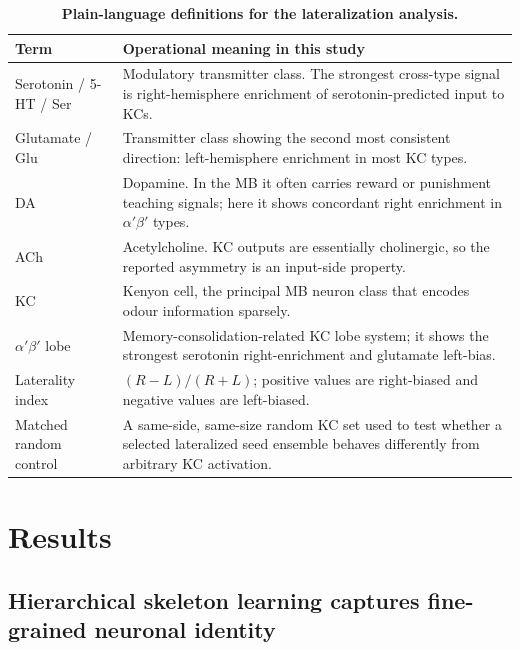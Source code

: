 \documentclass[10pt]{article}
\begin{document}
\begin{table}[!ht]
\centering\small
\caption{\textbf{Plain-language definitions for the lateralization analysis.}}
\label{tab:reader_guide}
\begin{tabularx}{\linewidth}{@{}p{3.2cm}X@{}}
\toprule
Term & Operational meaning in this study \\
\midrule
Serotonin / 5-HT / Ser & Modulatory transmitter class. The strongest cross-type signal is right-hemisphere enrichment of serotonin-predicted input to KCs. \\
Glutamate / Glu & Transmitter class showing the second most consistent direction: left-hemisphere enrichment in most KC types. \\
DA & Dopamine. In the MB it often carries reward or punishment teaching signals; here it shows concordant right enrichment in $\alpha'\beta'$ types. \\
ACh & Acetylcholine. KC outputs are essentially cholinergic, so the reported asymmetry is an input-side property. \\
KC & Kenyon cell, the principal MB neuron class that encodes odour information sparsely. \\
$\alpha'\beta'$ lobe & Memory-consolidation-related KC lobe system; it shows the strongest serotonin right-enrichment and glutamate left-bias. \\
Laterality index & \((R-L)/(R+L)\); positive values are right-biased and negative values are left-biased. \\
Matched random control & A same-side, same-size random KC set used to test whether a selected lateralized seed ensemble behaves differently from arbitrary KC activation. \\
\bottomrule
\end{tabularx}
\end{table}

\section*{Results}

\subsection*{Hierarchical skeleton learning captures fine-grained neuronal identity}
\end{document}
